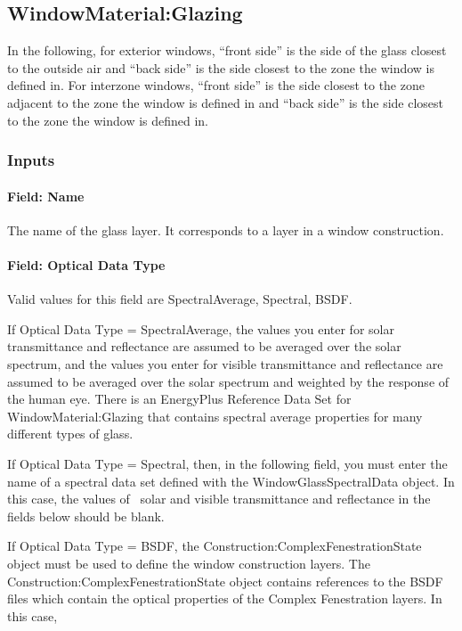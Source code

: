 \subsection{WindowMaterial:Glazing}\label{windowmaterialglazing}

In the following, for exterior windows, ``front side'' is the side of the glass closest to the outside air and ``back side'' is the side closest to the zone the window is defined in. For interzone windows, ``front side'' is the side closest to the zone adjacent to the zone the window is defined in and ``back side'' is the side closest to the zone the window is defined in.

\subsubsection{Inputs}\label{inputs-13-015}

\paragraph{Field: Name}\label{field-name-7-020}

The name of the glass layer. It corresponds to a layer in a window construction.

\paragraph{Field: Optical Data Type}\label{field-optical-data-type}

Valid values for this field are SpectralAverage, Spectral, BSDF.

If Optical Data Type = SpectralAverage, the values you enter for solar transmittance and reflectance are assumed to be averaged over the solar spectrum, and the values you enter for visible transmittance and reflectance are assumed to be averaged over the solar spectrum and weighted by the response of~ the human eye. There is an EnergyPlus Reference Data Set for WindowMaterial:Glazing that contains spectral average properties for many different types of glass.

If Optical Data Type = Spectral, then, in the following field, you must enter the name of a spectral data set defined with the WindowGlassSpectralData object. In this case, the values of~ solar and visible transmittance and reflectance in the fields below should be blank.

If Optical Data Type = BSDF, the Construction:ComplexFenestrationState object must be used to define the window construction layers. The Construction:ComplexFenestrationState object contains references to the BSDF files which contain the optical properties of the Complex Fenestration layers. In this case,

